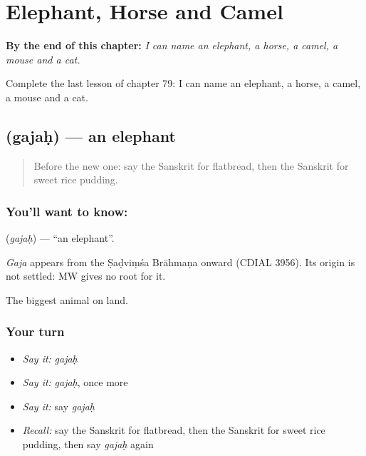 
\chapter{Elephant, Horse and Camel}
\label{ch:sa-elephant-horse-camel}

\begin{chapteropening}
\textbf{By the end of this chapter:} \emph{I can name an elephant, a horse, a camel, a mouse and a cat.}

Complete the last lesson of chapter 79: I can name an elephant, a horse, a camel, a mouse and a cat.
\end{chapteropening}

\section[\texorpdfstring{\sk{गजः} (gajaḥ)}{गजः (gajaḥ)}]{ (gajaḥ) — an elephant}

\label{lesson:SA-C79-elephant}



\begin{quote}
Before the new one: say the Sanskrit for flatbread, then the Sanskrit for sweet rice pudding.
\end{quote}

\subsection*{You'll want to know: }
\textbf{} (\emph{gajaḥ}) — \textquotedblleft{}an elephant\textquotedblright{}.

\begin{cousinweb}
\emph{Gaja} appears from the Ṣaḍviṃśa Brāhmaṇa onward (CDIAL 3956). Its origin is not settled: MW gives no root for it.
\end{cousinweb}

\begin{grammarlens}[title={What you've built}]
The biggest animal on land.
\end{grammarlens}

\subsection*{Your turn}
\begin{itemize}
\raggedright
  \item \emph{Say it:} \emph{gajaḥ}
  \item \emph{Say it:} \emph{gajaḥ}, once more
  \item \emph{Say it:} say \emph{gajaḥ}
  \item \emph{Recall:} say the Sanskrit for flatbread, then the Sanskrit for sweet rice pudding, then say \emph{gajaḥ} again
\end{itemize}

